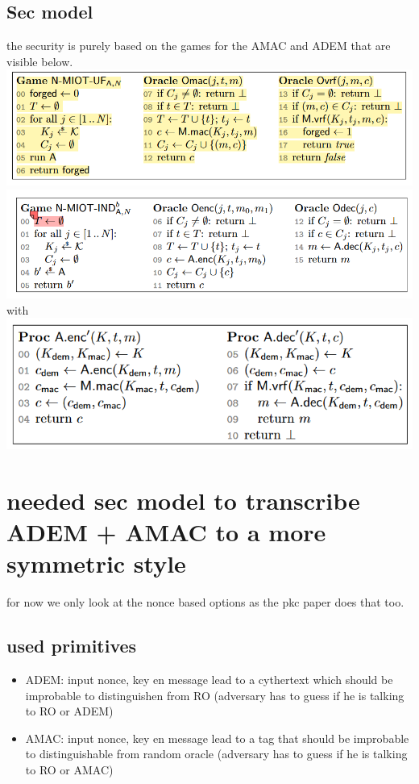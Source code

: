 \documentclass{article}
\begin{document}
\subsection{Sec model}
the security is purely based on the games for the AMAC and ADEM that are visible below.\\
\includegraphics[scale = 0.5]{gebrabbel images/game mac.png}\\
\includegraphics[scale = 0.5]{gebrabbel images/game adem.png}\\
with \includegraphics[scale = 0.5]{gebrabbel images/adem amac.png}\\


\newpage
\section{needed sec model to transcribe ADEM + AMAC to a more symmetric style}
for now we only look at the nonce based options as the pkc paper does that too.
\subsection{used primitives}
\begin{itemize}
    \item ADEM: input nonce, key en message lead to a cythertext which should be improbable to distinguishen from RO (adversary has to guess if he is talking to RO or ADEM)
    
    \item AMAC: input nonce, key en message lead to a tag that should be improbable to distinguishable from random oracle (adversary has to guess if he is talking to RO or AMAC)
\end{itemize}
\end{document}

